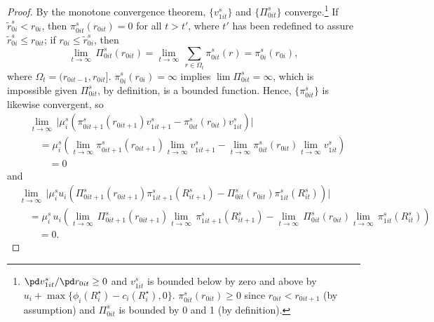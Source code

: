\begin{proof}
By the monotone convergence theorem, $\{v_{1it}^s\}$ and $\{\Pi_{0it}^s\}$ converge.\footnote{$\pd v_{1it}^s/\pd r_{0it}\ge0$ and $v_{1it}^s$ is bounded below by zero and above by $u_i+\max\{\phi_i(R_i^\star)-c_i(R_i^\star),0\}$. $\pi_{0it}^s(r_{0it})\ge0$ since $r_{0it}<r_{0it+1}$ (by assumption) and $\Pi_{0it}^s$ is bounded by 0 and 1 (by definition).} If $\widetilde r_{0i}^s<r_{0i}$, then $\pi_{0it}^s(r_{0it})=0$ for all $t>t'$, where $t'$ has been redefined to assure $\widetilde r_{0i}^s\le r_{0it}$; if $r_{0i}\le\widetilde r_{0i}^s$, then
\begin{equation}\label{equationA12}
	\lim_{t\rightarrow\infty}\,\Pi_{0it}^s(r_{0it})=\lim_{t\rightarrow\infty}\,\sum_{r\in\Omega_t}\pi_{0it}^s(r)=\pi_{0i}^s(r_{0i}),
\end{equation}
where $\Omega_t=(r_{0it-1},r_{0it}]$. $\pi_{0i}^s(r_{0i})=\infty$ implies $\lim\Pi_{0it}^s=\infty$, which is impossible given $\Pi_{0it}^s$, by definition, is a bounded function. Hence, $\{\pi_{0it}^s\}$ is likewise convergent, so
\begin{align*}
	&\lim_{t\rightarrow\infty}\,\Big|\mu_i^s\left(\pi_{0it+1}^s(r_{0it+1})v_{1it+1}^s-\pi_{0it}^s(r_{0it})v_{1it}^s\right)\Big|\\
	&\quad=\mu_i^s\left(\lim_{t\rightarrow\infty}\pi_{0it+1}^s(r_{0it+1})\lim_{t\rightarrow\infty}v_{1it+1}^s-\lim_{t\rightarrow\infty}\pi_{0it}^s(r_{0it})\lim_{t\rightarrow\infty}v_{1it}^s\right)\\
	&\qquad=0
\end{align*}
and
\begin{align*}
	&\lim_{t\rightarrow\infty}\,\Big|\mu_i^su_i\left(\Pi_{0it+1}^s(r_{0it+1})\pi_{1it+1}^s(R_{it+1}^s)-\Pi_{0it}^s(r_{0it})\pi_{1it}^s(R_{it}^s)\right)\Big|\\
	&\quad=\mu_i^s\,u_i\left(\lim_{t\rightarrow\infty}\,\Pi_{0it+1}^s(r_{0it+1})\lim_{t\rightarrow\infty}\,\pi_{1it+1}^s(R_{it+1}^s)-\lim_{t\rightarrow\infty}\,\Pi_{0it}^s(r_{0it})\lim_{t\rightarrow\infty}\,\pi_{1it}^s(R_{it}^s)\right)\\
	&\qquad=0.
\end{align*}


\end{proof}
